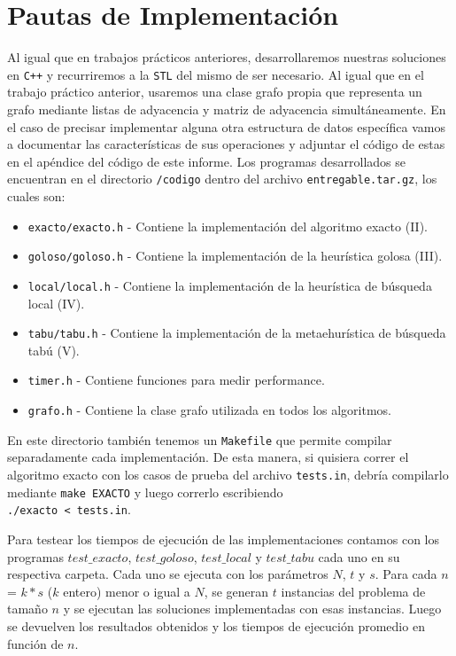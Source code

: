 \section{Pautas de Implementación}
\par{Al igual que en trabajos prácticos anteriores, desarrollaremos
nuestras soluciones en \texttt{C++} y recurriremos a la
\texttt{STL} del mismo de ser necesario. Al igual que en el trabajo práctico
anterior, usaremos una clase grafo propia que representa un grafo mediante
listas de adyacencia y matriz de adyacencia simultáneamente. En el caso de
precisar implementar alguna otra estructura de datos específica vamos a
documentar las características de sus operaciones y adjuntar el código de estas
en el apéndice del código de este informe. Los programas desarrollados se
encuentran en el directorio \texttt{/codigo} dentro del archivo
\texttt{entregable.tar.gz}, los cuales son:}

\begin{itemize}
\item \texttt{exacto/exacto.h} - Contiene la implementación del algoritmo exacto (II).
\item \texttt{goloso/goloso.h} - Contiene la implementación de la heurística golosa (III).
\item \texttt{local/local.h} - Contiene la implementación de la heurística de búsqueda local (IV).
\item \texttt{tabu/tabu.h} - Contiene la implementación de la metaehurística de búsqueda tabú (V).
\item \texttt{timer.h} - Contiene funciones para medir performance.
\item \texttt{grafo.h} - Contiene la clase grafo utilizada en todos los algoritmos.
\end{itemize}

\par{En este directorio también tenemos un \texttt{Makefile} que permite
compilar separadamente cada implementación. De esta manera, si quisiera correr
el algoritmo exacto con los casos de prueba del archivo \texttt{tests.in},
debría compilarlo mediante \texttt{make EXACTO} y luego correrlo escribiendo\\
\texttt{./exacto <  tests.in}.}\\

\par{Para testear los tiempos de ejecución de las
implementaciones contamos con los programas
$test\_exacto$, $test\_goloso$, $test\_local$ y $test\_tabu$ cada uno
en su respectiva carpeta. Cada uno se ejecuta con los parámetros
$N$, $t$ y $s$. Para cada $n$ = $k*s$ ($k$ entero) menor o igual a
$N$, se generan $t$ instancias del problema de tamaño $n$ y se
ejecutan las soluciones implementadas con esas instancias. Luego
se devuelven los resultados obtenidos y los tiempos de ejecución
promedio en función de $n$.}\\

